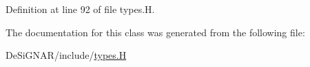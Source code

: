 Definition at line 92 of file types.\+H.



The documentation for this class was generated from the following file\+:\begin{DoxyCompactItemize}
\item 
De\+Si\+G\+N\+A\+R/include/\hyperlink{types_8_h}{types.\+H}\end{DoxyCompactItemize}
